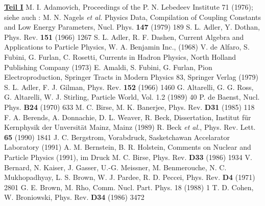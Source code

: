 \begin{thebibliography}{ABC.99}
 \underline{\LARGE\bf Teil I} 
 M. I. Adamovich, Proceedings of the P. N. Lebedeev
              Institute 71 (1976); siehe auch : M. N. Nagels {\em et al.}
	      Physics Data, Compilation of Coupling Constants and Low 
	      Energy Parameters, Nucl. Phys. {\bf 147} (1979) 189 
  S. L. Adler, Y. Dothan, Phys. Rev. {\bf 151}
              (1966) 1267	 
 S. L. Adler, R. F. Dashen, Current Algebra and
              Applications to Particle Physics, W. A. Benjamin Inc.,
	      (1968) 	      
 V. de Alfaro, S. Fubini, G. Furlan, C. Rosetti, 
              Currents in Hadron Physics, 
	      North Holland Publishing Company (1973)	      
 E. Amaldi, S. Fubini, G. Furlan, Pion
              Electroproduction, Springer Tracts in Modern Physics 83,
	      Springer Verlag (1979) 	           
  S. L. Adler, F. J. Gilman, Phys. Rev.
              {\bf 152} (1966) 1460
 G. Altarelli, G. G. Ross, 	      
 G. Altarelli, W. J. Stirling, Particle World, 
              Vol. 1.2 (1989) 40 	      
 P. de Baenst, Nucl. Phys. 
              {\bf B24} (1970) 633	      
 M. C. Birse, M. K. Banerjee, Phys. Rev. 
              {\bf D31} (1985) 118
 F. A. Berends, A. Donnachie, D. L. Weaver,
 R. Beck, Dissertation, Institut f\"ur 
              Kernphysik der Unversit\"at Mainz, Mainz (1989)	      
 R. Beck {\em et al.}, Phys. Rev. Lett. 
              {\bf 65} (1990) 1841
 J. C. Bergstrom, Vorabdruck, Sasketchawan
              Accelarator Laboratory (1991)	      
 A. M. Bernstein, B. R. Holstein, Comments on 
              Nuclear and Particle Physics (1991), im Druck	      
 M. C. Birse, Phys. Rev. 
              {\bf D33} (1986) 1934
 V. Bernard, N. Kaiser, J. Gasser, U.-G. Meissner,
 M. Benmerouche, N. C. Mukhopadhyay, 
 L. S. Brown, W. J. Pardee, R. D. Peccei, Phys.
              Rev. {\bf D4} (1971) 2801
 G. E. Brown, M. Rho, Comm. Nucl. Part. Phys. 18 (1988) 1      	      
 T. D. Cohen, W. Broniowski, Phys. Rev. 
              {\bf D34 } (1986) 3472

\end{thebibliography}
